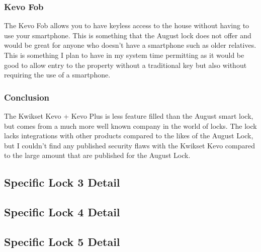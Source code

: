 \subsubsection*{Kevo Fob}
The Kevo Fob allows you to have keyless access to the house without having to use your smartphone. This is something that the August lock does not offer and would be great for anyone who doesn't have a smartphone such as older relatives. This is something I plan to have in my system time permitting as it would be good to allow entry to the property without a traditional key but also without requiring the use of a smartphone.


\subsubsection*{Conclusion}
The Kwikset Kevo + Kevo Plus is less feature filled than the August smart lock, but comes from a much more well known company in the world of locks. The lock lacks integrations with other products compared to the likes of the August Lock, but I couldn't find any published security flaws with the Kwikset Kevo compared to the large amount that are published for the August Lock.

\subsection{Specific Lock 3 Detail}

\subsection{Specific Lock 4 Detail}

\subsection{Specific Lock 5 Detail}

